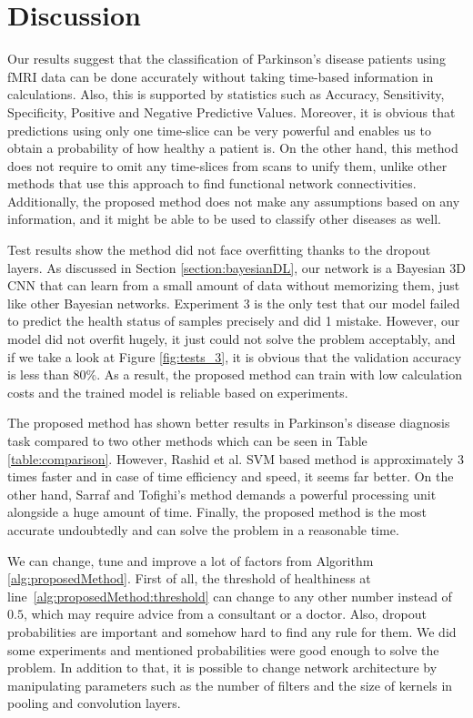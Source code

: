 \documentclass[a4paper,fleqn]{cas-dc}
\begin{document}
\section{Discussion}
\label{section:discussion}

Our results suggest that the classification of Parkinson’s disease patients using fMRI data can be done accurately without taking time-based information in calculations. Also, this is supported by statistics such as Accuracy, Sensitivity, Specificity, Positive and Negative Predictive Values. Moreover, it is obvious that predictions using only one time-slice can be very powerful and enables us to obtain a probability of how healthy a patient is. On the other hand, this method does not require to omit any time-slices from scans to unify them, unlike other methods that use this approach to find functional network connectivities. Additionally, the proposed method does not make any assumptions based on any information, and it might be able to be used to classify other diseases as well.

Test results show the method did not face overfitting thanks to the dropout layers. As discussed in Section \ref{section:bayesianDL}, our network is a Bayesian 3D CNN that can learn from a small amount of data without memorizing them, just like other Bayesian networks. Experiment 3 is the only test that our model failed to predict the health status of samples precisely and did 1 mistake. However, our model did not overfit hugely, it just could not solve the problem acceptably, and if we take a look at Figure \ref{fig:tests_3}, it is obvious that the validation accuracy is less than $80\%$. As a result, the proposed method can train with low calculation costs and the trained model is reliable based on experiments.

The proposed method has shown better results in Parkinson's disease diagnosis task compared to two other methods which can be seen in Table \ref{table:comparison}. However, Rashid et al. SVM based method is approximately 3 times faster and in case of time efficiency and speed, it seems far better. On the other hand, Sarraf and Tofighi's method demands a powerful processing unit alongside a huge amount of time. Finally, the proposed method is the most accurate undoubtedly and can solve the problem in a reasonable time.

We can change, tune and improve a lot of factors from Algorithm \ref{alg:proposedMethod}. First of all, the threshold of healthiness at line~\ref{alg:proposedMethod:threshold} can change to any other number instead of $0.5$, which may require advice from a consultant or a doctor. Also, dropout probabilities are important and somehow hard to find any rule for them. We did some experiments and mentioned probabilities were good enough to solve the problem. In addition to that, it is possible to change network architecture by manipulating parameters such as the number of filters and the size of kernels in pooling and convolution layers.
\end{document}
